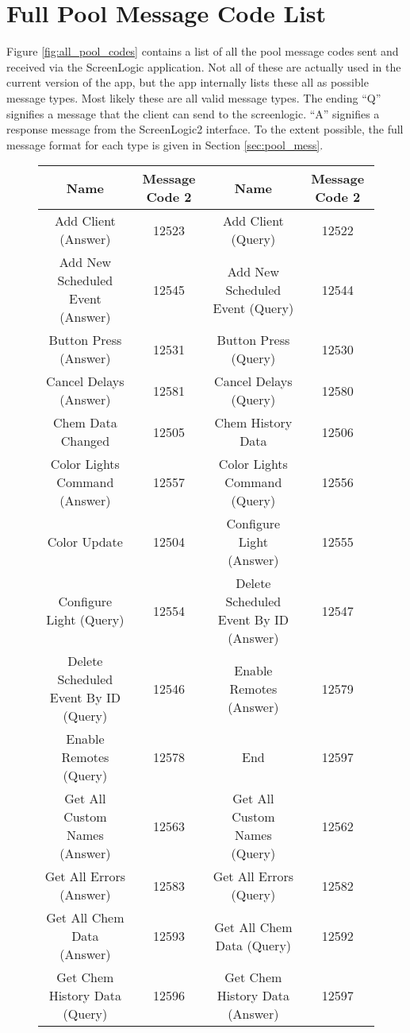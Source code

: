 \documentclass[11pt]{article}
\begin{document}
\appendix
\section{Full Pool Message Code List}
\label{sec:pool_messages_list}
Figure \ref{fig:all_pool_codes} contains a list of all the pool message codes sent and received via the ScreenLogic application. Not all of these are actually used in the current version of the app, but the app internally lists these all as possible message types. Most likely these are all valid message types. The ending ``Q'' signifies a message that the client can send to the screenlogic. ``A'' signifies a response message from the ScreenLogic2 interface. To the extent possible, the full message format for each type is given in Section \ref{sec:pool_mess}.

\begin{figure}[!h]
\footnotesize
\begin{tabular}{ c | c || c | c}
Name & Message Code 2 & Name & Message Code 2 \\
\hline\hline
Add Client (Answer) & 12523  & Add Client (Query) & 12522 \\ 
Add New Scheduled Event (Answer) & 12545  & Add New Scheduled Event (Query) & 12544 \\ 
Button Press (Answer) & 12531  & Button Press (Query) & 12530 \\ 
Cancel Delays (Answer) & 12581  & Cancel Delays (Query) & 12580 \\ 
Chem Data Changed & 12505  & Chem History Data & 12506 \\ 
Color Lights Command (Answer) & 12557  & Color Lights Command (Query) & 12556 \\ 
Color Update & 12504  & Configure Light (Answer) & 12555 \\ 
Configure Light (Query) & 12554  & Delete Scheduled Event By ID (Answer) & 12547 \\ 
Delete Scheduled Event By ID (Query) & 12546  & Enable Remotes (Answer) & 12579 \\ 
Enable Remotes (Query) & 12578  & End & 12597 \\ 
Get All Custom Names (Answer) & 12563  & Get All Custom Names (Query) & 12562 \\ 
Get All Errors (Answer) & 12583  & Get All Errors (Query) & 12582 \\ 
Get All Chem Data (Answer) & 12593  & Get All Chem Data (Query) & 12592 \\ 
Get Chem History Data (Query) & 12596  & Get Chem History Data (Answer) & 12597 \\ 

\end{tabular}
\end{figure}
\end{document}
